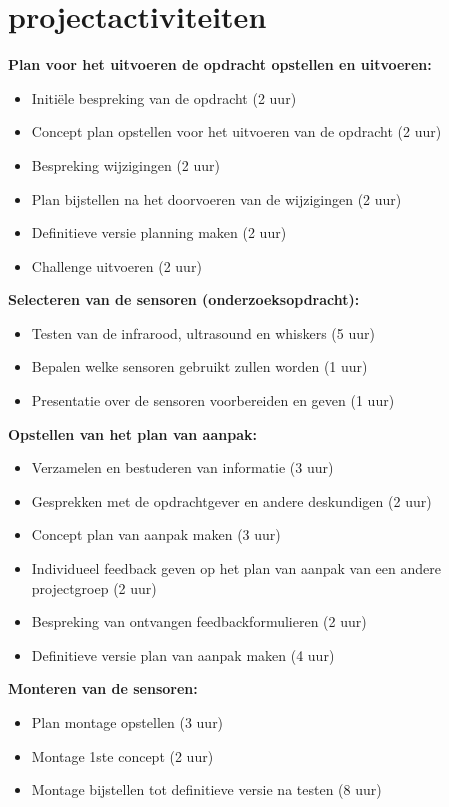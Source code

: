 \documentclass[oneside]{book}
\begin{document}
\chapter{projectactiviteiten}
\textbf{ Plan voor het uitvoeren de opdracht opstellen en uitvoeren:}
\begin{itemize}
\item Initiële bespreking van de opdracht (2 uur)
\item Concept plan opstellen voor het uitvoeren van de opdracht (2 uur)
\item Bespreking wijzigingen (2 uur)
\item Plan bijstellen na het doorvoeren van de wijzigingen (2 uur)
\item Definitieve versie planning maken (2 uur)
\item Challenge uitvoeren (2 uur)
\end{itemize}

\textbf{Selecteren van de sensoren (onderzoeksopdracht):}
\begin{itemize}
\item Testen van de infrarood, ultrasound en whiskers (5 uur)
\item Bepalen welke sensoren gebruikt zullen worden (1 uur)
\item Presentatie over de sensoren voorbereiden en geven (1 uur)
\end{itemize}

\textbf{Opstellen van het plan van aanpak:}
\begin{itemize}
\item Verzamelen en bestuderen van informatie (3 uur)
\item Gesprekken met de opdrachtgever en andere deskundigen (2 uur)
\item Concept plan van aanpak maken (3 uur)
\item Individueel feedback geven op het plan van aanpak van een andere projectgroep  (2 uur)
\item Bespreking van ontvangen feedbackformulieren (2 uur)
\item Definitieve versie plan van aanpak maken (4 uur)
\end{itemize}

\textbf{Monteren van de sensoren:}
\begin{itemize}
\item Plan montage opstellen (3 uur)
\item Montage 1ste concept (2 uur)
\item Montage bijstellen tot definitieve versie na testen (8 uur)
\end{itemize}
\end{document}
